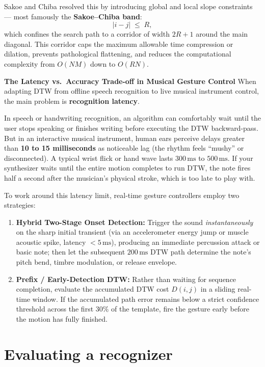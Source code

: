 \begin{historybox}
Sakoe and Chiba resolved this by introducing global and local slope constraints --- most famously the \textbf{Sakoe--Chiba band}:
\[
  |i - j| \;\le\; R,
\]
which confines the search path to a corridor of width $2R+1$ around the main diagonal. This corridor caps the maximum allowable time compression or dilation, prevents pathological flattening, and reduces the computational complexity from $O(NM)$ down to $O(RN)$.
\end{historybox}

\begin{trapbox}
\textbf{The Latency vs.\ Accuracy Trade-off in Musical Gesture Control}
When adapting DTW from offline speech recognition to live musical instrument control, the main problem is \textbf{recognition latency}.

In speech or handwriting recognition, an algorithm can comfortably wait until the user stops speaking or finishes writing before executing the DTW backward-pass. But in an interactive musical instrument, human ears perceive delays greater than \textbf{10 to 15 milliseconds} as noticeable lag (the rhythm feels ``mushy'' or disconnected). A typical wrist flick or hand wave lasts $300\,\text{ms}$ to $500\,\text{ms}$. If your synthesizer waits until the entire motion completes to run DTW, the note fires half a second after the musician's physical stroke, which is too late to play with.

To work around this latency limit, real-time gesture controllers employ two strategies:
\begin{enumerate}
  \item \textbf{Hybrid Two-Stage Onset Detection:} Trigger the sound \emph{instantaneously} on the sharp initial transient (via an accelerometer energy jump or muscle acoustic spike, latency $<5\,\text{ms}$), producing an immediate percussion attack or basic note; then let the subsequent $200\,\text{ms}$ DTW path determine the note's pitch bend, timbre modulation, or release envelope.
  \item \textbf{Prefix / Early-Detection DTW:} Rather than waiting for sequence completion, evaluate the accumulated DTW cost $D(i,j)$ in a sliding real-time window. If the accumulated path error remains below a strict confidence threshold across the first $30\%$ of the template, fire the gesture early before the motion has fully finished.
\end{enumerate}
\end{trapbox}

\section{Evaluating a recognizer}
\label{ch38:evaluation}

